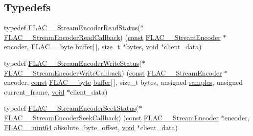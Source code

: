 \subsection*{Typedefs}
\begin{DoxyCompactItemize}
\item 
typedef \hyperlink{group__flac__stream__encoder_ga2e81f007fb0a7414c0bbb453f37ea37f}{F\+L\+A\+C\+\_\+\+\_\+\+Stream\+Encoder\+Read\+Status}($\ast$ \hyperlink{group__flac__stream__encoder_ga18b7941b93bae067192732e913536d44}{F\+L\+A\+C\+\_\+\+\_\+\+Stream\+Encoder\+Read\+Callback}) (\hyperlink{getopt1_8c_a2c212835823e3c54a8ab6d95c652660e}{const} \hyperlink{struct_f_l_a_c_____stream_encoder}{F\+L\+A\+C\+\_\+\+\_\+\+Stream\+Encoder} $\ast$encoder, \hyperlink{ordinals_8h_a5eb569b12d5b047cdacada4d57924ee3}{F\+L\+A\+C\+\_\+\+\_\+byte} \hyperlink{structbuffer}{buffer}\mbox{[}$\,$\mbox{]}, size\+\_\+t $\ast$bytes, \hyperlink{sound_8c_ae35f5844602719cf66324f4de2a658b3}{void} $\ast$client\+\_\+data)
\item 
typedef \hyperlink{group__flac__stream__encoder_ga3737471fd49730bb8cf9b182bdeda05e}{F\+L\+A\+C\+\_\+\+\_\+\+Stream\+Encoder\+Write\+Status}($\ast$ \hyperlink{group__flac__stream__encoder_ga50865125fd57c40fab6eb2f062651429}{F\+L\+A\+C\+\_\+\+\_\+\+Stream\+Encoder\+Write\+Callback}) (\hyperlink{getopt1_8c_a2c212835823e3c54a8ab6d95c652660e}{const} \hyperlink{struct_f_l_a_c_____stream_encoder}{F\+L\+A\+C\+\_\+\+\_\+\+Stream\+Encoder} $\ast$encoder, \hyperlink{getopt1_8c_a2c212835823e3c54a8ab6d95c652660e}{const} \hyperlink{ordinals_8h_a5eb569b12d5b047cdacada4d57924ee3}{F\+L\+A\+C\+\_\+\+\_\+byte} \hyperlink{structbuffer}{buffer}\mbox{[}$\,$\mbox{]}, size\+\_\+t bytes, unsigned \hyperlink{test__w__saw8_8c_a54185623a5a093f671a73e5fba6197a1}{samples}, unsigned current\+\_\+frame, \hyperlink{sound_8c_ae35f5844602719cf66324f4de2a658b3}{void} $\ast$client\+\_\+data)
\item 
typedef \hyperlink{group__flac__stream__encoder_ga6d5be3489f45fcf0c252022c65d87aca}{F\+L\+A\+C\+\_\+\+\_\+\+Stream\+Encoder\+Seek\+Status}($\ast$ \hyperlink{group__flac__stream__encoder_ga70b85349d5242e4401c4d8ddf6d9bbca}{F\+L\+A\+C\+\_\+\+\_\+\+Stream\+Encoder\+Seek\+Callback}) (\hyperlink{getopt1_8c_a2c212835823e3c54a8ab6d95c652660e}{const} \hyperlink{struct_f_l_a_c_____stream_encoder}{F\+L\+A\+C\+\_\+\+\_\+\+Stream\+Encoder} $\ast$encoder, \hyperlink{ordinals_8h_aa78c8c70a3eb8a58af7436f278acde8e}{F\+L\+A\+C\+\_\+\+\_\+uint64} absolute\+\_\+byte\+\_\+offset, \hyperlink{sound_8c_ae35f5844602719cf66324f4de2a658b3}{void} $\ast$client\+\_\+data)

\end{DoxyCompactItemize}
